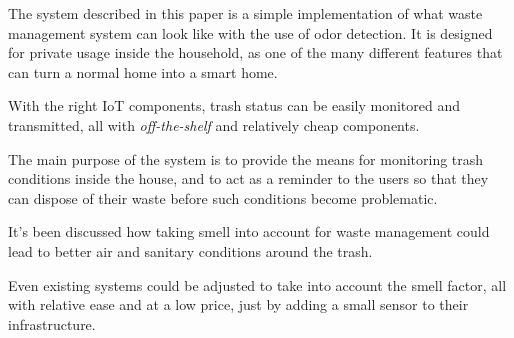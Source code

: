 
The system described in this paper is a simple implementation of what waste management system can look like with the use of odor detection. 
It is designed for private usage inside the household, as one of the many different features that can turn a normal home into a smart home.

With the right IoT components, trash status can be easily monitored and transmitted, all with \textit{off-the-shelf} and relatively cheap components.

The main purpose of the system is to provide the means for monitoring trash conditions inside the house, and to act as a reminder to the users so that they can dispose of their waste before such conditions become problematic.

It's been discussed how taking smell into account for waste management could lead to better air and sanitary conditions around the trash.

Even existing systems could be adjusted to take into account the smell factor, all with relative ease and at a low price, just by adding a small sensor to their infrastructure.


